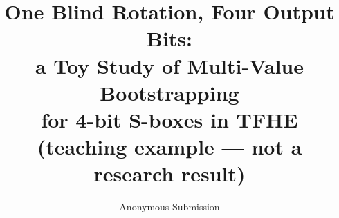 \documentclass[runningheads]{llncs}   %
\newif\ifanon   \anontrue    %
\begin{document}
\title{One Blind Rotation, Four Output Bits:\\ a Toy Study of Multi-Value Bootstrapping\\ for 4-bit S-boxes in TFHE\\ \normalsize(teaching example --- not a research result)}
\ifanon
  \author{Anonymous Submission}
  \institute{}
\else
\fi
\maketitle




\ifanon\else
\subsubsection*{Acknowledgements.} Teaching example of the crypto-research-agents toolkit.
\fi



\appendix

\end{document}
